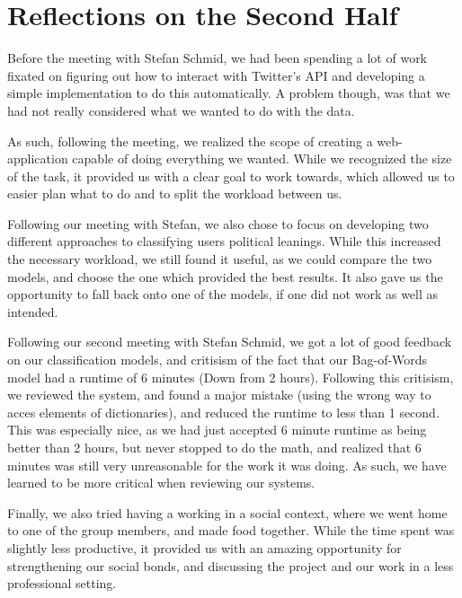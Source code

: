 \section{Reflections on the Second Half}\label{sec:SecRef}
Before the meeting with Stefan Schmid, we had been spending a lot of work
fixated on figuring out how to interact with Twitter's API and developing a simple
implementation to do this automatically. A problem though, was that we had not
really considered what we wanted to do with the data.\nl

As such, following the meeting, we realized the scope of creating a
web-application capable of doing everything we wanted. While we recognized the
size of the task, it provided us with a clear goal to work towards, which
allowed us to easier plan what to do and to split the workload between us.\nl  

Following our meeting with Stefan, we also chose to focus on developing two
different approaches to classifying users political leanings. While this
increased the necessary workload, we still found it useful, as we could compare
the two models, and choose the one which provided the best results. It also
gave us the opportunity to fall back onto one of the models, if one did not work
as well as intended.\nl

Following our second meeting with Stefan Schmid, we got a lot of good feedback
on our classification models, and critisism of the fact that our Bag-of-Words
model had a runtime of 6 minutes (Down from 2 hours). Following this critisism,
we reviewed the system, and found a major mistake (using the wrong way to acces
elements of dictionaries), and reduced the runtime to less than 1 second. This
was especially nice, as we had just accepted 6 minute runtime as being better
than 2 hours, but never stopped to do the math, and realized that 6 minutes was
still very unreasonable for the work it was doing. As such, we have learned to
be more critical when reviewing our systems.\nl

Finally, we also tried having a working in a social context, where we went home
to one of the group members, and made food together. While the time spent was
slightly less productive, it provided us with an amazing opportunity for
strengthening our social bonds, and discussing the project and our work in a
less professional setting.